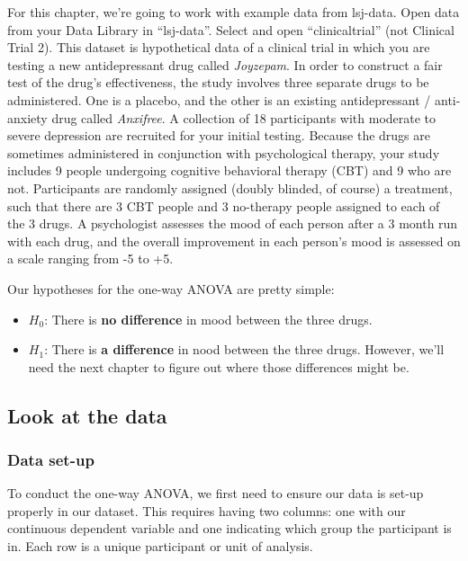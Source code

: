 \documentclass[
]{book}
\providecommand{\tightlist}{%
  \setlength{\itemsep}{0pt}\setlength{\parskip}{0pt}}
\begin{document}
For this chapter, we're going to work with example data from lsj-data. Open data from your Data Library in ``lsj-data''. Select and open ``clinicaltrial'' (not Clinical Trial 2). This dataset is hypothetical data of a clinical trial in which you are testing a new antidepressant drug called \emph{Joyzepam}. In order to construct a fair test of the drug's effectiveness, the study involves three separate drugs to be administered. One is a placebo, and the other is an existing antidepressant / anti-anxiety drug called \emph{Anxifree}. A collection of 18 participants with moderate to severe depression are recruited for your initial testing. Because the drugs are sometimes administered in conjunction with psychological therapy, your study includes 9 people undergoing cognitive behavioral therapy (CBT) and 9 who are not. Participants are randomly assigned (doubly blinded, of course) a treatment, such that there are 3 CBT people and 3 no-therapy people assigned to each of the 3 drugs. A psychologist assesses the mood of each person after a 3 month run with each drug, and the overall improvement in each person's mood is assessed on a scale ranging from -5 to +5.

Our hypotheses for the one-way ANOVA are pretty simple:

\begin{itemize}
\tightlist
\item
  \(H_0\): There is \textbf{no difference} in mood between the three drugs.
\item
  \(H_1\): There is \textbf{a difference} in nood between the three drugs. However, we'll need the next chapter to figure out where those differences might be.
\end{itemize}

\hypertarget{look-at-the-data-6}{%
\subsection{Look at the data}\label{look-at-the-data-6}}

\hypertarget{data-set-up-6}{%
\subsubsection{Data set-up}\label{data-set-up-6}}

To conduct the one-way ANOVA, we first need to ensure our data is set-up properly in our dataset. This requires having two columns: one with our continuous dependent variable and one indicating which group the participant is in. Each row is a unique participant or unit of analysis.
\end{document}
